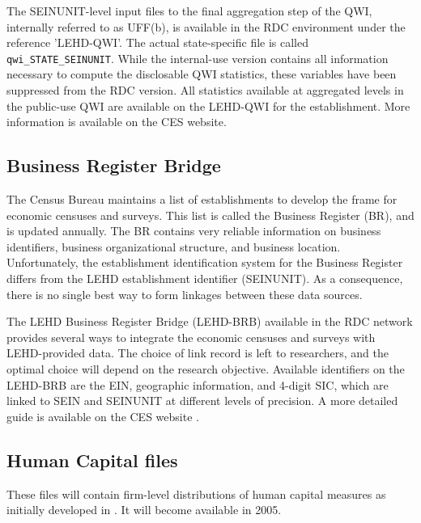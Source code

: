 The SEINUNIT-level input files to the final aggregation step of the QWI,
internally referred to as UFF(b), is available in the RDC
environment under the reference 'LEHD-QWI'. The actual
state-specific file is called {\tt qwi\_{STATE}\_SEINUNIT}. While the
internal-use version contains all information necessary to compute the
disclosable QWI statistics, these variables have been suppressed from the
RDC version. All statistics available at aggregated levels in the
public-use QWI are available on the LEHD-QWI for the establishment. More
information is available on the CES website.

\subsection{Business Register Bridge}
\label{sec:BRB}
\label{sec:LEHD-BRB}
The Census Bureau maintains a list of establishments 
to develop the frame for economic censuses and surveys. This list is called
the  Business Register (BR), and is updated annually. 
 The BR contains very reliable information on business 
identifiers, business organizational structure, and business
location. Unfortunately,  the establishment identification system for the Business Register 
differs from the LEHD establishment identifier (SEINUNIT). As a consequence, there is no 
single best way to form linkages between these data sources. 

The LEHD Business Register Bridge (LEHD-BRB) available in the RDC network
provides several ways to integrate the economic censuses and surveys with
LEHD-provided data. The choice of link record is left to researchers, and
the optimal choice will depend on the research objective. Available
identifiers on the LEHD-BRB are the EIN, geographic information, and
4-digit SIC, which are linked to SEIN and SEINUNIT at different levels of
precision. A more detailed guide is available on the CES website \citep{ip-lehd-brb}.

\subsection{Human Capital files}

These files will contain firm-level distributions of human capital measures
as initially developed in \citet{tp-2002-09}. It will become available in 2005.

